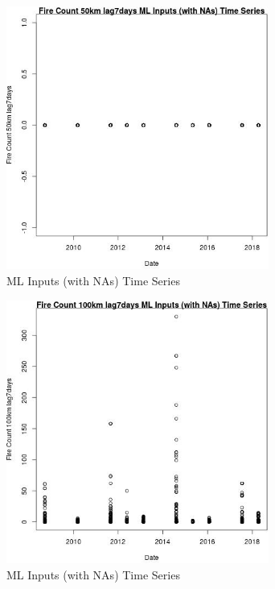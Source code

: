 \begin{figure} 
\centering  
\includegraphics[width=0.77\textwidth]{Code_Outputs/Report_ML_input_PM25_Step4_part_e_de_duplicated_aves_compiled_2019-05-18wNAs_Fire_Count_50km_lag7daysvDate.jpg} 
\caption{\label{fig:Report_ML_input_PM25_Step4_part_e_de_duplicated_aves_compiled_2019-05-18wNAsFire_Count_50km_lag7daysvDate}ML Inputs (with NAs) Time Series} 
\end{figure} 
 

\begin{figure} 
\centering  
\includegraphics[width=0.77\textwidth]{Code_Outputs/Report_ML_input_PM25_Step4_part_e_de_duplicated_aves_compiled_2019-05-18wNAs_Fire_Count_100km_lag7daysvDate.jpg} 
\caption{\label{fig:Report_ML_input_PM25_Step4_part_e_de_duplicated_aves_compiled_2019-05-18wNAsFire_Count_100km_lag7daysvDate}ML Inputs (with NAs) Time Series} 
\end{figure} 
 

